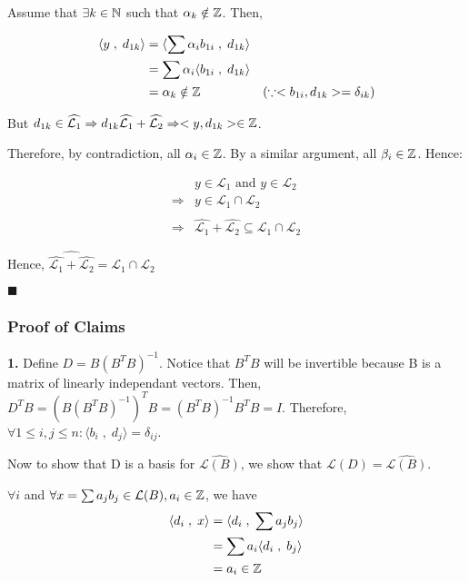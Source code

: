 Assume that $\exists k \in \mathbb{N}$ such that $\alpha_k \notin \mathbb{Z}$. Then,

\begin{align*}
    \langle y \;,\; d_{1k} \rangle &= \langle \sum \alpha_i b_{1i} \;,\; d_{1k}\rangle \\
    &= \sum \alpha_i \langle b_{1i} \;,\; d_{1k}\rangle \\
    &= \alpha_k \notin \mathbb{Z} &(\because <b_{1i}, d_{1k}> = \delta_{ik})
\end{align*}

But $d_{1k} \in \widehat{\mathcal{L}_1} \Rightarrow d_{1k} \widehat{\mathcal{L}_1} + \widehat{\mathcal{L}_2} \Rightarrow <y, d_{1k}> \in \mathbb{Z}$.

Therefore, by contradiction, all $\alpha_i \in \mathbb{Z}$. By a similar argument, all $\beta_i \in \mathbb{Z}$. Hence: 

\begin{align*}
    &y \in \mathcal{L}_1 \text{ and }y \in \mathcal{L}_2 \\
    \Rightarrow &y \in \mathcal{L}_1 \cap \mathcal{L}_2 \\
    \Rightarrow &\widehat{\hat{\mathcal{L}_1} + \hat{\mathcal{L}_2}} \subseteq \mathcal{L}_1 \cap \mathcal{L}_2
\end{align*}

Hence, $\widehat{\hat{\mathcal{L}_1} + \hat{\mathcal{L}_2}} = \mathcal{L}_1 \cap \mathcal{L}_2$

\hfill $\blacksquare$

\subsubsection*{Proof of Claims}
\textbf{1. } Define $D = B(B^TB)^{-1}$. Notice that $B^TB$ will be invertible because B is a matrix of linearly independant vectors. Then, $D^TB = (B(B^TB)^{-1})^TB =  (B^TB)^{-1}B^TB = I$.
Therefore, $\forall 1 \le i, j \le n:  \langle b_i \;,\; d_j \rangle = \delta_{ij}$.

Now to show that D is a basis for $\widehat{\mathcal{L}(B)}$, we show that $\mathcal{L}(D) = \widehat{\mathcal{L}(B)}$.

$\forall i$ and $\forall x = \sum a_j b_j \in \mathcal{L}(B), a_i \in \mathbb{Z}$, we have
\begin{align*}
    \langle d_i \;, \; x \rangle &= \langle d_i \;, \; \sum a_j b_j \rangle \\
    &= \sum a_i \langle d_i \;,\; b_j \rangle \\
    &= a_i \in \mathbb{Z}
\end{align*}

